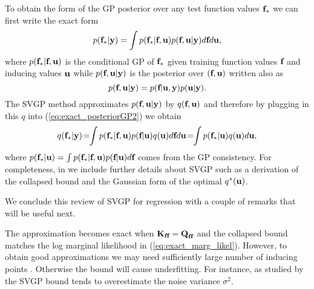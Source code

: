 To obtain the form of the GP posterior 
over any test function values $\textbf{f}_*$ we can first write the exact form 
\begin{equation}
p(\textbf{f}_* | \textbf{y}) 
= \int p(\textbf{f}_* | \textbf{f}, \textbf{u}) p(\textbf{f},  \textbf{u} | \textbf{y})  d \textbf{f} d \textbf{u}, 
\label{eq:exact_posteriorGP2}
\end{equation}
where $p(\textbf{f}_* | \textbf{f}, \textbf{u})$  is the conditional GP of $\textbf{f}_*$  given 
training function values $\textbf{f}$ and inducing values $\textbf{u}$ while 
$p(\textbf{f},  \textbf{u} | \textbf{y})$ is the posterior 
over $(\textbf{f}, \textbf{u})$ written also 
as 
\begin{equation}
p(\textbf{f},  \textbf{u} | \textbf{y}) = p(\textbf{f} | \textbf{u}, \textbf{y}) p(\textbf{u} | \textbf{y}).
\label{eq:exact_augm_posterior}
\end{equation}
The SVGP method approximates $p(\textbf{f},  \textbf{u} | \textbf{y})$ by $q(\textbf{f}, \textbf{u})$ and therefore by plugging in this $q$ into (\ref{eq:exact_posteriorGP2}) we obtain
\begin{equation}
q(\textbf{f}_* | \textbf{y}) 
\! = \! \! \int p(\textbf{f}_* | \textbf{f}, \textbf{u}) p(\textbf{f} |  \textbf{u}) q(\textbf{u})  d \textbf{f} d \textbf{u} \! = \! \! 
\int p(\textbf{f}_* | \textbf{u}) q(\textbf{u}) d \textbf{u}, 
\label{eq:variational_posteriorGP}
\end{equation}
where $p(\textbf{f}_* | \textbf{u}) = \int p(\textbf{f}_* | \textbf{f}, \textbf{u}) p(\textbf{f} |  \textbf{u}) d \textbf{f}$ comes from the GP consistency. For completeness, in 
we include further details about SVGP such as a derivation of the collapsed bound and the 
Gaussian form 
of the optimal 
$q^*(\textbf{u})$. 

We conclude this review of SVGP for regression with a couple of remarks that will be useful next. 

\begin{remark}
The approximation becomes exact when 
$\textbf{K}_{\textbf{f} \textbf{f}} = \textbf{Q}_{\textbf{f} \textbf{f}}$ and the collapsed bound %
matches the log marginal likelihood in 
(\ref{eq:exact_marg_likel}). However, to obtain good approximations we may need sufficiently large number of inducing points \cite{burt2020convergence}.  Otherwise the bound will cause underfitting. 
For instance, as studied by 
\citet{baueretal16} 
the SVGP bound tends to overestimate the noise variance $\sigma^2$. 
\label{remark1}
\end{remark}

